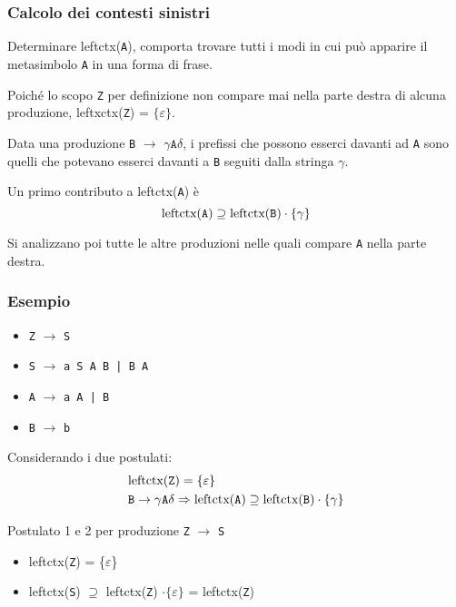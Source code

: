 \subsubsection{Calcolo dei contesti sinistri}
Determinare leftctx(\texttt{A}), comporta trovare tutti i modi in cui può apparire il metasimbolo \texttt{A} in una forma di frase.

Poiché lo scopo \texttt{Z} per definizione non compare mai nella parte destra di alcuna produzione, leftxctx(\texttt{Z}) = $\{ \varepsilon \}$.

Data una produzione \texttt{B} $\rightarrow$ $\gamma \texttt{A} \delta$, i prefissi che possono esserci davanti ad \texttt{A} sono quelli che potevano esserci davanti a \texttt{B} seguiti dalla stringa $\gamma$.

Un primo contributo a leftctx(\texttt{A}) è
\begin{equation*}
    \text{leftctx(\texttt{A})} \supseteq \text{leftctx(\texttt{B})} \cdot \{\gamma\}
\end{equation*}

Si analizzano poi tutte le altre produzioni nelle quali compare \texttt{A} nella parte destra.

\subsubsection{Esempio}

\begin{itemize}
    \item \texttt{Z} $\rightarrow$ \texttt{S}
    \item \texttt{S} $\rightarrow$ \texttt{a S A B | B A}
    \item \texttt{A} $\rightarrow$ \texttt{a A | B}
    \item \texttt{B} $\rightarrow$ \texttt{b}
\end{itemize}
\setlist{}

Considerando i due postulati:
\begin{align*}
    &\text{leftctx(\texttt{Z})} = \{ \varepsilon \}\\
    &\texttt{B} \rightarrow \gamma \texttt{A} \delta \Rightarrow \text{leftctx(\texttt{A})} \supseteq \text{leftctx(\texttt{B})} \cdot \{\gamma\}
\end{align*}

Postulato 1 e 2 per produzione \texttt{Z} $\rightarrow$ \texttt{S}
\begin{itemize}
    \item leftctx(\texttt{Z}) = \{$\varepsilon$\}
    \item leftctx(\texttt{S}) $\supseteq$ leftctx(\texttt{Z}) $\cdot \{\varepsilon\}$ = leftctx(\texttt{Z})
\end{itemize}
\setlist{}

